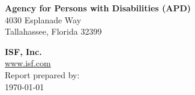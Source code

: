 \begin{flushleft}

\phantom{ghost text}

\vspace{\fill}

\noindent \textbf{Agency for Persons with Disabilities (APD)} \\
4030 Esplanade Way \\
Tallahassee, Florida 32399

\vspace{1cm}
\noindent \textbf{ISF, Inc.} \\
\href{https://www.isf.com}{www.isf.com} \\
Report prepared by: \\
\today

\end{flushleft}


\tableofcontents

\newpage


